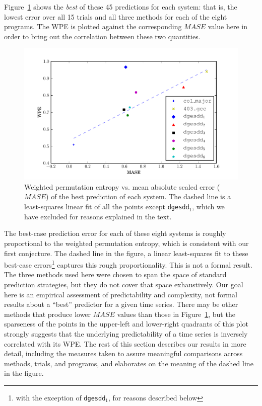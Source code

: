 Figure~\ref{fig:wpe_vs_mase_best} shows the {\sl best} of these 45
predictions for each system: that is, the lowest error over all 15
trials and all three methods for each of the eight programs.  The WPE
is plotted against the corresponding $MASE$ value here in order to bring
out the correlation between these two quantities.
\begin{figure}[htbp]
  \centering
  \includegraphics[width=\columnwidth]{figs/prediction_vs_entropy}
  \caption{Weighted permutation entropy vs. mean absolute scaled error
    ($MASE$) of the best prediction of each system.
% 
% 
The dashed line is a least-squares linear fit of all the points except
{\tt dgesdd$_1$}, which we have excluded for reasons explained in the
text.}
  \label{fig:wpe_vs_mase_best}
\end{figure}
The best-case prediction error for each of these eight systems is
roughly proportional to the weighted permutation entropy, which is
consistent with our first conjecture.  The dashed line in the figure,
a linear least-squares fit to these best-case errors\footnote{with the
  exception of {\tt dgesdd$_1$}, for reasons described below} captures
this rough proportionality.  This is not a formal result.  The three
methods used here were chosen to span the space of standard prediction
strategies, but they do not cover that space exhaustively.  Our goal
here is an empirical assessment of predictability and complexity, not
formal results about a ``best'' predictor for a given time series.
There may be other methods that produce lower $MASE$ values than those
in Figure~\ref{fig:wpe_vs_mase_best}, but the sparseness of the points
in the upper-left and lower-right quadrants of this plot strongly
suggests that the underlying predictability of a time series is
inversely correlated with its WPE.  The rest of this section describes
our results in more detail, including the measures taken to assure
meaningful comparisons across methods, trials, and programs, and
elaborates on the meaning of the dashed line in the figure.

